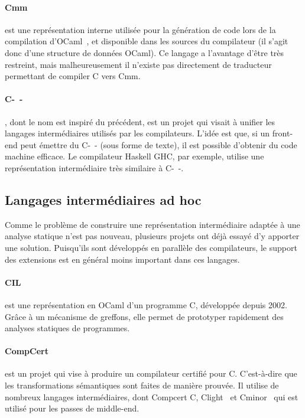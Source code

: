 \paragraph{Cmm} est une représentation interne utilisée pour la génération de
code lors de la compilation d'OCaml~, et disponible dans les sources
du compilateur (il s'agit donc d'une structure de données OCaml). Ce langage a
l'avantage d'être très restreint, mais malheureusement il n'existe pas
directement de traducteur permettant de compiler C vers Cmm.

\paragraph{C-~-}\cite{spjcmm} , dont le nom est inspiré du précédent,
est un projet qui visait à unifier les langages intermédiaires utilisés par les
compilateurs. L'idée est que, si un front-end peut émettre du C-~- (sous forme de
texte), il est possible d'obtenir du code machine efficace. Le compilateur
Haskell GHC, par exemple, utilise une représentation intermédiaire très
similaire à C-~-.

\subsection*{Langages intermédiaires ad hoc}

Comme le problème de construire une représentation intermédiaire adaptée à une
analyse statique n'est pas nouveau, plusieurs projets ont déjà essayé d'y
apporter une solution. Puisqu'ils sont développés en parallèle des compilateurs,
le support des extensions est en général moins important dans ces langages.

\paragraph{CIL}\cite{NeculaCil}  est une représentation en
OCaml d'un programme C, développée depuis 2002. Grâce à un mécanisme de
greffons, elle permet de prototyper rapidement des analyses statiques de
programmes.

\paragraph{CompCert} est un projet qui vise à produire un compilateur certifié
pour C. C'est-à-dire que les transformations sémantiques sont faites de manière
prouvée. Il utilise de nombreux langages intermédiaires, dont Compcert C,
Clight~\cite{cfront} et Cminor~\cite{cminorSL} qui est utilisé pour les passes
de middle-end.

